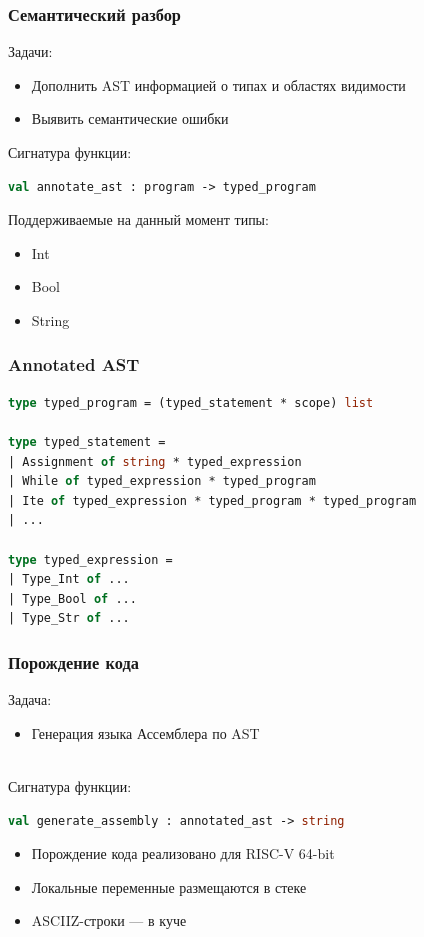 \documentclass{beamer}
\begin{document}
		\begin{frame}[fragile]
			\frametitle{Семантический разбор}
			Задачи:
			\begin{itemize}
				\item Дополнить AST информацией о типах и областях видимости
				\item Выявить семантические ошибки
			\end{itemize}
			Сигнатура функции:
			\begin{lstlisting}[language=ML] 
		val annotate_ast : program -> typed_program
			\end{lstlisting}
			Поддерживаемые на данный момент типы:
			\begin{itemize}
				\item Int
				\item Bool
				\item String
			\end{itemize}
		\end{frame}

	\begin{frame}[fragile]
		\frametitle{Annotated AST}
		\begin{lstlisting}[basicstyle=\footnotesize\ttfamily, language=ML]
type typed_program = (typed_statement * scope) list

type typed_statement =
| Assignment of string * typed_expression
| While of typed_expression * typed_program
| Ite of typed_expression * typed_program * typed_program
| ...

type typed_expression =
| Type_Int of ...
| Type_Bool of ...
| Type_Str of ...
		\end{lstlisting}
	\end{frame}

	\begin{frame}[fragile]
		\frametitle{Порождение кода}
		Задача:
		\begin{itemize}
			\item Генерация языка Ассемблера по AST
		\end{itemize}
		\\
		Сигнатура функции:
		\begin{lstlisting}[language=ML] 
	val generate_assembly : annotated_ast -> string
		\end{lstlisting}

		\begin{itemize}
			\item Порождение кода реализовано для RISC-V 64-bit
			\item Локальные переменные размещаются в стеке
			\item ASCIIZ-строки — в куче
		\end{itemize}
	\end{frame}
\end{document}
